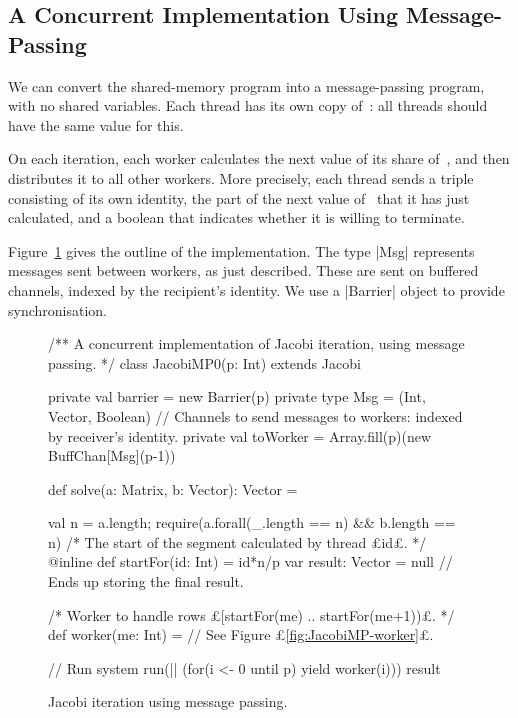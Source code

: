 
\subsection{A Concurrent Implementation Using Message-Passing}

We can convert the shared-memory program into a message-passing program, with
no shared variables.  Each thread has its own copy of~: all threads
should have the same value for this.  

On each iteration, each worker calculates the next value of its share
of~, and then distributes it to all other workers.  More precisely,
each thread sends a triple consisting of its own identity, the part of the
next value of~ that it has just calculated, and a boolean that
indicates whether it is willing to terminate.  

Figure~\ref{fig:JacobiMP} gives the outline of the implementation.  The type
|Msg| represents messages sent between workers, as just described.  These are
sent on buffered channels, indexed by the recipient's identity.  We use a
|Barrier| object to provide synchronisation.


\begin{figure}
\begin{scala}
/** A concurrent implementation of Jacobi iteration, using message passing. */
class JacobiMP0(p: Int) extends Jacobi{
  private val barrier = new Barrier(p)
  private type Msg = (Int, Vector, Boolean)
  // Channels to send messages to workers: indexed by receiver's identity.
  private val toWorker = Array.fill(p)(new BuffChan[Msg](p-1))

  def solve(a: Matrix, b: Vector): Vector = {
    val n = a.length; require(a.forall(_.length == n) && b.length == n)
    /* The start of the segment calculated by thread £id£. */
    @inline def startFor(id: Int) = id*n/p
    var result: Vector = null // Ends up storing the final result.

    /* Worker to handle rows £[startFor(me) .. startFor(me+1))£. */
    def worker(me: Int) = // See Figure £\ref{fig:JacobiMP-worker}£.

    // Run system
    run(|| (for(i <- 0 until p) yield worker(i)))
    result
  }
}
\end{scala}
\caption{Jacobi iteration using message passing.}
\label{fig:JacobiMP}
\end{figure}

